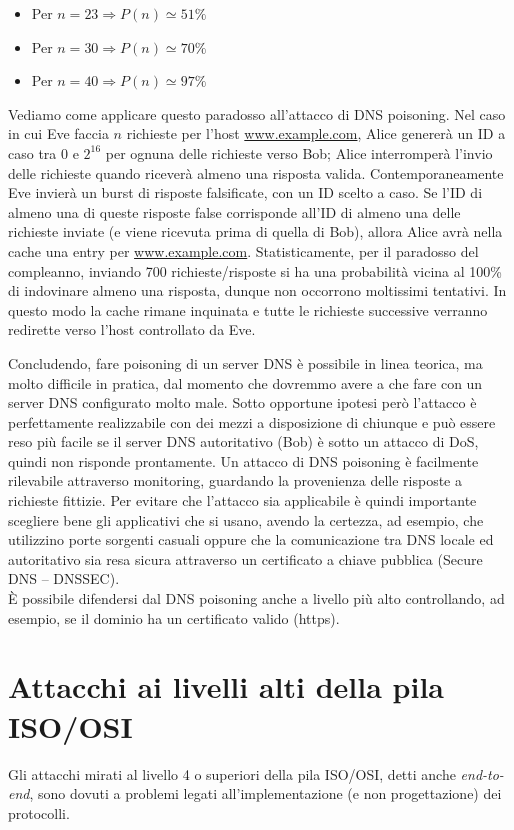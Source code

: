 \begin{itemize}
	\item Per $n=23 \Longrightarrow P(n) \simeq 51\%$
	\item Per $n=30 \Longrightarrow P(n) \simeq 70\%$
	\item Per $n=40 \Longrightarrow P(n) \simeq 97\%$
\end{itemize}
Vediamo come applicare questo paradosso all'attacco di DNS poisoning. Nel caso in cui Eve faccia $n$ richieste per l'host \url{www.example.com}, Alice genererà un ID a caso tra 0 e $2^{16}$ per ognuna delle richieste verso Bob; Alice interromperà
l'invio delle richieste quando riceverà almeno una risposta valida. Contemporaneamente Eve invierà un burst di risposte falsificate, con un ID scelto a caso. Se l'ID di almeno una di queste risposte false corrisponde all'ID di almeno una delle richieste inviate (e viene ricevuta prima di quella di Bob), allora Alice avrà nella cache una entry per \url{www.example.com}. Statisticamente, per il paradosso del compleanno, inviando 700 richieste/risposte si ha una probabilità vicina al 100\% di indovinare almeno una risposta, dunque non occorrono moltissimi tentativi. In questo modo la cache rimane inquinata e tutte le richieste successive verranno redirette verso l'host controllato da Eve.

Concludendo, fare poisoning di un server DNS è possibile in linea teorica, ma molto difficile in pratica, dal momento che dovremmo avere a che fare con un server DNS configurato molto male. Sotto opportune ipotesi però l'attacco è perfettamente realizzabile con dei mezzi a disposizione di chiunque e può essere reso più facile se il server DNS autoritativo (Bob) è sotto un attacco di DoS, quindi non risponde prontamente. Un attacco di DNS poisoning è facilmente rilevabile attraverso monitoring, guardando la provenienza delle risposte a richieste fittizie. Per evitare che l'attacco sia applicabile è quindi importante scegliere bene gli applicativi che si usano, avendo la certezza, ad esempio, che utilizzino porte sorgenti casuali oppure che la comunicazione tra DNS locale ed autoritativo sia resa sicura attraverso un certificato a chiave pubblica (Secure DNS -- DNSSEC).\\
È possibile difendersi dal DNS poisoning anche a livello più alto controllando, ad esempio, se il dominio ha un certificato valido (https).

\section{Attacchi ai livelli alti della pila ISO/OSI}
Gli attacchi mirati al livello 4 o superiori della pila ISO/OSI, detti anche \textit{end-to-end}, sono dovuti a problemi legati all'implementazione (e non progettazione) dei protocolli.

